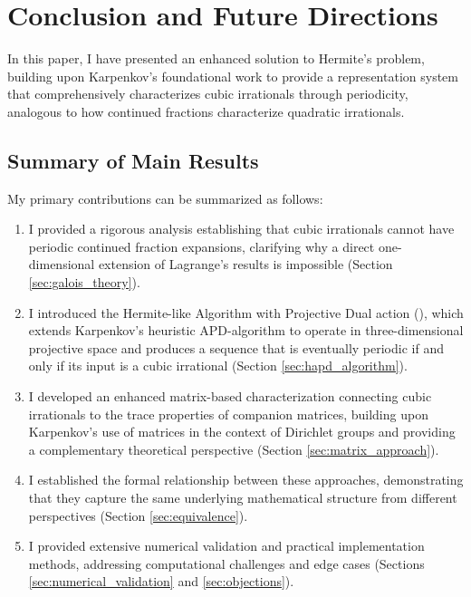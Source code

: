 \section{Conclusion and Future Directions}\label{sec:conclusion}

In this paper, I have presented an enhanced solution to Hermite's problem, building upon Karpenkov's foundational work \cite{Karpenkov2022} to provide a representation system that comprehensively characterizes cubic irrationals through periodicity, analogous to how continued fractions characterize quadratic irrationals.

\subsection{Summary of Main Results}

My primary contributions can be summarized as follows:

\begin{enumerate}
    \item I provided a rigorous analysis establishing that cubic irrationals cannot have periodic continued fraction expansions, clarifying why a direct one-dimensional extension of Lagrange's results is impossible (Section \ref{sec:galois_theory}).
    
    \item I introduced the Hermite-like Algorithm with Projective Dual action (\HAPD), which extends Karpenkov's heuristic APD-algorithm to operate in three-dimensional projective space and produces a sequence that is eventually periodic if and only if its input is a cubic irrational (Section \ref{sec:hapd_algorithm}).
    
    \item I developed an enhanced matrix-based characterization connecting cubic irrationals to the trace properties of companion matrices, building upon Karpenkov's use of matrices in the context of Dirichlet groups and providing a complementary theoretical perspective (Section \ref{sec:matrix_approach}).
    
    \item I established the formal relationship between these approaches, demonstrating that they capture the same underlying mathematical structure from different perspectives (Section \ref{sec:equivalence}).
    
    \item I provided extensive numerical validation and practical implementation methods, addressing computational challenges and edge cases (Sections \ref{sec:numerical_validation} and \ref{sec:objections}).
\end{enumerate}

